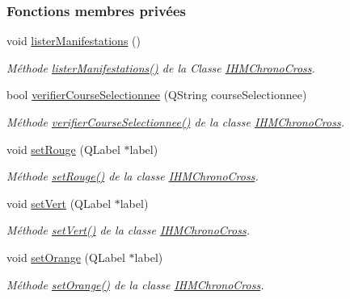 \subsubsection*{Fonctions membres privées}
\begin{DoxyCompactItemize}
\item 
void \hyperlink{class_i_h_m_chrono_cross_adb47e6ee9c2a917a6df77b64930c3c48}{lister\+Manifestations} ()
\begin{DoxyCompactList}\small\item\em Méthode \hyperlink{class_i_h_m_chrono_cross_adb47e6ee9c2a917a6df77b64930c3c48}{lister\+Manifestations()} de la Classe \hyperlink{class_i_h_m_chrono_cross}{I\+H\+M\+Chrono\+Cross}. \end{DoxyCompactList}\item 
bool \hyperlink{class_i_h_m_chrono_cross_afa7d1fb0245bb3e8bbffdf2687b02248}{verifier\+Course\+Selectionnee} (Q\+String course\+Selectionnee)
\begin{DoxyCompactList}\small\item\em Méthode \hyperlink{class_i_h_m_chrono_cross_afa7d1fb0245bb3e8bbffdf2687b02248}{verifier\+Course\+Selectionnee()} de la classe \hyperlink{class_i_h_m_chrono_cross}{I\+H\+M\+Chrono\+Cross}. \end{DoxyCompactList}\item 
void \hyperlink{class_i_h_m_chrono_cross_a3b46a31326bdde2b5ad67a9f0a6de76b}{set\+Rouge} (Q\+Label $\ast$label)
\begin{DoxyCompactList}\small\item\em Méthode \hyperlink{class_i_h_m_chrono_cross_a3b46a31326bdde2b5ad67a9f0a6de76b}{set\+Rouge()} de la classe \hyperlink{class_i_h_m_chrono_cross}{I\+H\+M\+Chrono\+Cross}. \end{DoxyCompactList}\item 
void \hyperlink{class_i_h_m_chrono_cross_aba2b1a136332baa7bd4905f9af15705b}{set\+Vert} (Q\+Label $\ast$label)
\begin{DoxyCompactList}\small\item\em Méthode \hyperlink{class_i_h_m_chrono_cross_aba2b1a136332baa7bd4905f9af15705b}{set\+Vert()} de la classe \hyperlink{class_i_h_m_chrono_cross}{I\+H\+M\+Chrono\+Cross}. \end{DoxyCompactList}\item 
void \hyperlink{class_i_h_m_chrono_cross_a7e2424925f588d7a1914befc3c6c832e}{set\+Orange} (Q\+Label $\ast$label)
\begin{DoxyCompactList}\small\item\em Méthode \hyperlink{class_i_h_m_chrono_cross_a7e2424925f588d7a1914befc3c6c832e}{set\+Orange()} de la classe \hyperlink{class_i_h_m_chrono_cross}{I\+H\+M\+Chrono\+Cross}. \end{DoxyCompactList}\item 

\end{DoxyCompactItemize}
